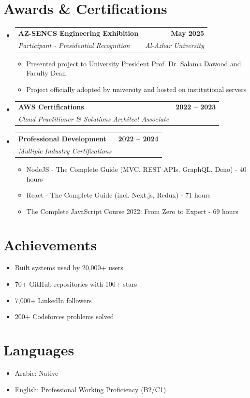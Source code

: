 \documentclass[letterpaper,11pt]{article}
\makeatletter
\newcommand{\resumeItem}[1]{
  \item\small{
    {#1 \vspace{-2pt}}
  }
}
\newcommand{\resumeSubheading}[4]{
  \vspace{-2pt}\item
    \begin{tabular*}{1.0\textwidth}[t]{l@{\extracolsep{\fill}}r}
      \textbf{#1} & \textbf{\small #2} \\
      \textit{\small#3} & \textit{\small #4} \\
    \end{tabular*}\vspace{-7pt}
}
\newcommand{\resumeSubHeadingListStart}{\begin{itemize}[leftmargin=0.0in, label={}]}
\newcommand{\resumeSubHeadingListEnd}{\end{itemize}}
\newcommand{\resumeItemListStart}{\begin{itemize}}
\newcommand{\resumeItemListEnd}{\end{itemize}\vspace{-5pt}}
\makeatother
\begin{document}
\section{Awards \& Certifications}
\resumeSubHeadingListStart
    \resumeSubheading{AZ-SENCS Engineering Exhibition}{May 2025}{Participant - Presidential Recognition}{Al-Azhar University}
        \resumeItemListStart
            \resumeItem{Presented project to University President Prof. Dr. Salama Dawood and Faculty Dean}
            \resumeItem{Project officially adopted by university and hosted on institutional servers}
        \resumeItemListEnd
        
    \resumeSubheading{AWS Certifications}{2022 -- 2023}{Cloud Practitioner \& Solutions Architect Associate}{}
    
    \resumeSubheading{Professional Development}{2022 -- 2024}{Multiple Industry Certifications}{}
        \resumeItemListStart
            \resumeItem{NodeJS - The Complete Guide (MVC, REST APIs, GraphQL, Deno) - 40 hours}
            \resumeItem{React - The Complete Guide (incl. Next.js, Redux) - 71 hours}
            \resumeItem{The Complete JavaScript Course 2022: From Zero to Expert - 69 hours}
        \resumeItemListEnd
\resumeSubHeadingListEnd

\section{Achievements}
\vspace{-3pt}
\resumeItemListStart
  \resumeItem{Built systems used by 20,000+ users}
  \resumeItem{70+ GitHub repositories with 100+ stars}
  \resumeItem{7,000+ LinkedIn followers}
  \resumeItem{200+ Codeforces problems solved}
\resumeItemListEnd

\section{Languages}
\vspace{-3pt}
\resumeItemListStart
  \resumeItem{Arabic: Native}
  \resumeItem{English: Professional Working Proficiency (B2/C1)}
\resumeItemListEnd
\end{document}
